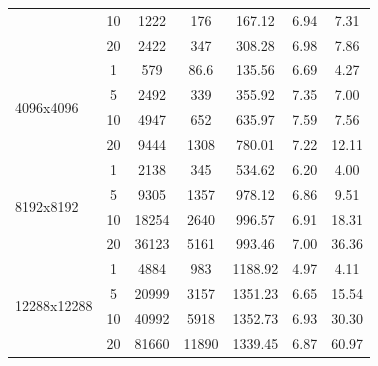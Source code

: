 \documentclass[sigconf]{acmart}
\begin{document}
\begin{table}[h]
{\begin{tabular}{ccccccc}
                & 10 & 1222  & 176   & 167.12  & 6.94 & 7.31                     \\ \cline{2-7}
                & 20 & 2422  & 347   & 308.28  & 6.98 & 7.86                     \\ \hline
                \multicolumn{1}{l}{\multirow{4}{*}{4096x4096}}   & 1  & 579   & 86.6  & 135.56  & 6.69 & 4.27                     \\ \cline{2-7}
                \multicolumn{1}{l}{}                             & 5  & 2492  & 339   & 355.92  & 7.35 & 7.00 \\ \cline{2-7}
                \multicolumn{1}{l}{}                             & 10 & 4947  & 652   & 635.97  & 7.59 & 7.56                     \\ \cline{2-7}
                \multicolumn{1}{l}{}                             & 20 & 9444  & 1308  & 780.01  & 7.22 & 12.11                    \\ \hline
                \multicolumn{1}{l}{\multirow{4}{*}{8192x8192}}   & 1  & 2138  & 345   & 534.62  & 6.20 & 4.00                     \\ \cline{2-7}
                \multicolumn{1}{l}{}                             & 5  & 9305  & 1357  & 978.12  & 6.86 & 9.51                     \\ \cline{2-7}
                \multicolumn{1}{l}{}                             & 10 & 18254 & 2640  & 996.57  & 6.91 & 18.31                    \\ \cline{2-7}
                \multicolumn{1}{l}{}                             & 20 & 36123 & 5161  & 993.46  & 7.00 & 36.36                    \\ \hline
                \multicolumn{1}{l}{\multirow{4}{*}{12288x12288}} & 1  & 4884  & 983   & 1188.92 & 4.97 & 4.11                     \\ \cline{2-7}
                \multicolumn{1}{l}{}                             & 5  & 20999 & 3157  & 1351.23 & 6.65 & 15.54                    \\ \cline{2-7}
                \multicolumn{1}{l}{}                             & 10 & 40992 & 5918  & 1352.73 & 6.93 & 30.30                    \\ \cline{2-7}
                \multicolumn{1}{l}{}                             & 20 & 81660 & 11890 & 1339.45 & 6.87 & 60.97                    \\ \hline
            \end{tabular}%
        }
    \end{table}
\end{document}
